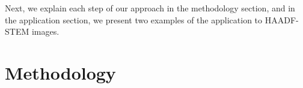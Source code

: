 \documentclass[twocolumn,amsmath, floatfix]{revtex4}
\begin{document}
Next, we explain each step of our approach in the methodology section, and in the application section, we present two examples of the application to HAADF-STEM images.


\section{Methodology}
\end{document}
